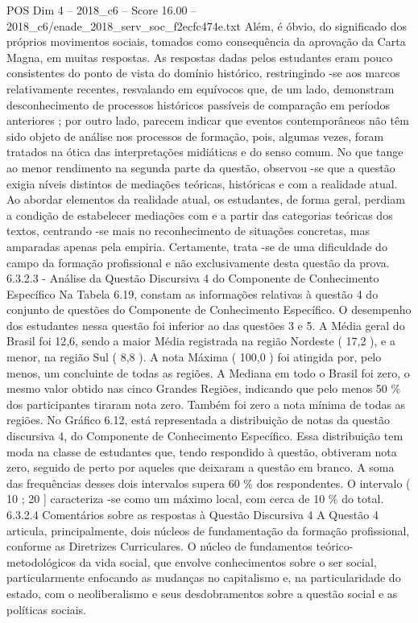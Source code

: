 \begin{textsample}{POS Dim 4 – 2018\_c6 – Score 16.00 – 2018\_c6/enade\_2018\_serv\_soc\_f2ecfc474e.txt}
Além, é óbvio, do significado dos próprios movimentos sociais, tomados como consequência da aprovação da Carta Magna, em muitas respostas.
As respostas dadas pelos estudantes eram pouco consistentes do ponto de vista do domínio histórico, restringindo -se aos marcos relativamente recentes, resvalando em equívocos que, de um lado, demonstram desconhecimento de processos históricos passíveis de comparação em períodos anteriores ; por outro lado, parecem indicar que eventos contemporâneos não têm sido objeto de análise nos processos de formação, pois, algumas vezes, foram tratados na ótica das interpretações midiáticas e do senso comum.
No que tange ao menor rendimento na segunda parte da questão, observou -se que a questão exigia níveis distintos de mediações teóricas, históricas e com a realidade atual.
Ao abordar elementos da realidade atual, os estudantes, de forma geral, perdiam a condição de estabelecer mediações com e a partir das categorias teóricas dos textos, centrando -se mais no reconhecimento de situações concretas, mas amparadas apenas pela empiria.
Certamente, trata -se de uma dificuldade do campo da formação profissional e não exclusivamente desta questão da prova. 6.3.2.3 - Análise da Questão Discursiva 4 do Componente de Conhecimento Específico Na Tabela 6.19, constam as informações relativas à questão 4 do conjunto de questões do Componente de Conhecimento Específico.
O desempenho dos estudantes nessa questão foi inferior ao das questões 3 e 5.
A Média geral do Brasil foi 12,6, sendo a maior Média registrada na região Nordeste ( 17,2 ), e a menor, na região Sul ( 8,8 ).
A nota Máxima ( 100,0 ) foi atingida por, pelo menos, um concluinte de todas as regiões.
A Mediana em todo o Brasil foi zero, o mesmo valor obtido nas cinco Grandes Regiões, indicando que pelo menos 50 \% dos participantes tiraram nota zero.
Também foi zero a nota mínima de todas as regiões.
No Gráfico 6.12, está representada a distribuição de notas da questão discursiva 4, do Componente de Conhecimento Específico.
Essa distribuição tem moda na classe de estudantes que, tendo respondido à questão, obtiveram nota zero, seguido de perto por aqueles que deixaram a questão em branco.
A soma das frequências desses dois intervalos supera 60 \% dos respondentes.
O intervalo ( 10 ; 20 ] caracteriza -se como um máximo local, com cerca de 10 \% do total. 6.3.2.4 Comentários sobre as respostas à Questão Discursiva 4 A Questão 4 articula, principalmente, dois núcleos de fundamentação da formação profissional, conforme as Diretrizes Curriculares.
O núcleo de fundamentos teórico-metodológicos da vida social, que envolve conhecimentos sobre o ser social, particularmente enfocando as mudanças no capitalismo e, na particularidade do estado, com o neoliberalismo e seus desdobramentos sobre a questão social e as políticas sociais.

\end{textsample}
